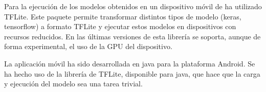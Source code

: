 Para la ejecución de los modelos obtenidos en un dispositivo móvil de ha utilizado TFLite. Este paquete permite transformar distintos tipos de modelo (keras, tensorflow) a formato TFLite y ejecutar estos modelos en dispositivos con recursos reducidos. En las últimas versiones de esta librería se soporta, aunque de forma experimental, el uso de la GPU del dispositivo.

La aplicación móvil ha sido desarrollada en java para la plataforma Android. Se ha hecho uso de la librería de TFLite, disponible para java, que hace que la carga y ejecución del modelo sea una tarea trivial.